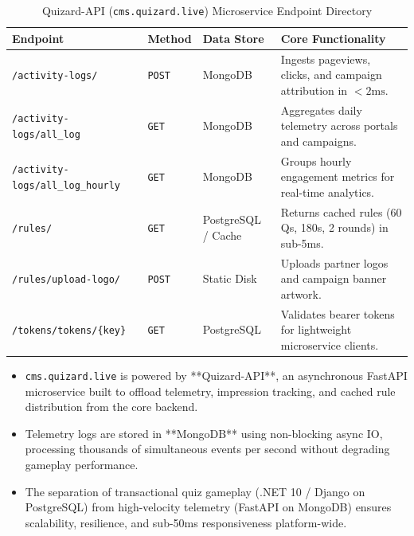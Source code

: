 \begin{table}[htbp]
\centering
\small
\begin{tabular}{|p{3.8cm}|p{1.4cm}|p{2.8cm}|p{6.0cm}|}
\hline
\rowcolor{primaryBlue!15}
\textbf{Endpoint} & \textbf{Method} & \textbf{Data Store} & \textbf{Core Functionality} \\ \hline
\texttt{/activity-logs/} & \texttt{POST} & MongoDB & Ingests pageviews, clicks, and campaign attribution in $<2\text{ms}$. \\ \hline
\texttt{/activity-logs/all\_log} & \texttt{GET} & MongoDB & Aggregates daily telemetry across portals and campaigns. \\ \hline
\texttt{/activity-logs/all\_log\_hourly} & \texttt{GET} & MongoDB & Groups hourly engagement metrics for real-time analytics. \\ \hline
\texttt{/rules/} & \texttt{GET} & PostgreSQL / Cache & Returns cached rules (60 Qs, 180s, 2 rounds) in sub-5ms. \\ \hline
\texttt{/rules/upload-logo/} & \texttt{POST} & Static Disk & Uploads partner logos and campaign banner artwork. \\ \hline
\texttt{/tokens/tokens/\{key\}} & \texttt{GET} & PostgreSQL & Validates bearer tokens for lightweight microservice clients. \\ \hline
\end{tabular}
\caption{Quizard-API (\texttt{cms.quizard.live}) Microservice Endpoint Directory}
\end{table}

\begin{tcolorbox}[summarybox, title={Chapter Key Takeaways}]
\begin{itemize}
    \item \texttt{cms.quizard.live} is powered by **Quizard-API**, an asynchronous FastAPI microservice built to offload telemetry, impression tracking, and cached rule distribution from the core backend.
    \item Telemetry logs are stored in **MongoDB** using non-blocking async IO, processing thousands of simultaneous events per second without degrading gameplay performance.
    \item The separation of transactional quiz gameplay (.NET 10 / Django on PostgreSQL) from high-velocity telemetry (FastAPI on MongoDB) ensures scalability, resilience, and sub-50ms responsiveness platform-wide.
\end{itemize}
\end{tcolorbox}
